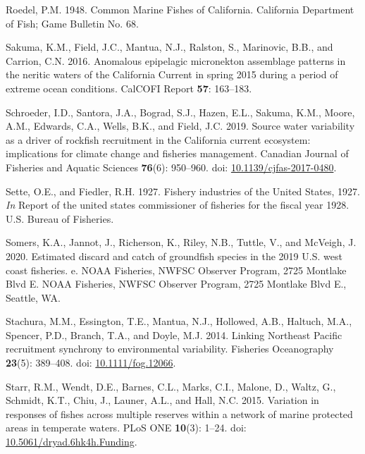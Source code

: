 \documentclass[11pt,
  english,
]{article}
\newlength{\cslhangindent}
\newenvironment{CSLReferences}[2] %
 {%
  \setlength{\parindent}{0pt}
  \ifodd #1 \everypar{\setlength{\hangindent}{\cslhangindent}}\ignorespaces\fi
  \ifnum #2 > 0
  \setlength{\parskip}{#2\baselineskip}
  \fi
 }%
 {}
\begin{document}
\begin{CSLReferences}{1}{0}
\leavevmode{}%
Roedel, P.M. 1948. {Common Marine Fishes of California}. California Department of Fish; Game Bulletin No. 68.

\leavevmode{}%
Sakuma, K.M., Field, J.C., Mantua, N.J., Ralston, S., Marinovic, B.B., and Carrion, C.N. 2016. {Anomalous epipelagic micronekton assemblage patterns in the neritic waters of the California Current in spring 2015 during a period of extreme ocean conditions}. CalCOFI Report \textbf{57}: 163--183.

\leavevmode{}%
Schroeder, I.D., Santora, J.A., Bograd, S.J., Hazen, E.L., Sakuma, K.M., Moore, A.M., Edwards, C.A., Wells, B.K., and Field, J.C. 2019. {Source water variability as a driver of rockfish recruitment in the California current ecosystem: implications for climate change and fisheries management}. Canadian Journal of Fisheries and Aquatic Sciences \textbf{76}(6): 950--960. doi: \href{https://doi.org/10.1139/cjfas-2017-0480}{10.1139/cjfas-2017-0480}.

\leavevmode{}%
Sette, O.E., and Fiedler, R.H. 1927. {Fishery industries of the United States, 1927}. \emph{In} Report of the united states commissioner of fisheries for the fiscal year 1928. U.S. Bureau of Fisheries.

\leavevmode{}%
Somers, K.A., Jannot, J., Richerson, K., Riley, N.B., Tuttle, V., and McVeigh, J. 2020. {Estimated discard and catch of groundfish species in the 2019 U.S. west coast fisheries. e}. NOAA Fisheries, NWFSC Observer Program, 2725 Montlake Blvd E. NOAA Fisheries, NWFSC Observer Program, 2725 Montlake Blvd E., Seattle, WA.

\leavevmode{}%
Stachura, M.M., Essington, T.E., Mantua, N.J., Hollowed, A.B., Haltuch, M.A., Spencer, P.D., Branch, T.A., and Doyle, M.J. 2014. {Linking Northeast Pacific recruitment synchrony to environmental variability}. Fisheries Oceanography \textbf{23}(5): 389--408. doi: \href{https://doi.org/10.1111/fog.12066}{10.1111/fog.12066}.

\leavevmode{}%
Starr, R.M., Wendt, D.E., Barnes, C.L., Marks, C.I., Malone, D., Waltz, G., Schmidt, K.T., Chiu, J., Launer, A.L., and Hall, N.C. 2015. {Variation in responses of fishes across multiple reserves within a network of marine protected areas in temperate waters}. PLoS ONE \textbf{10}(3): 1--24. doi: \href{https://doi.org/10.5061/dryad.6hk4h.Funding}{10.5061/dryad.6hk4h.Funding}.


\end{CSLReferences}
\end{document}
